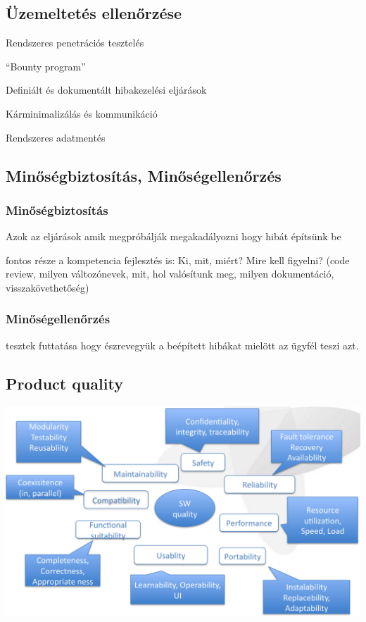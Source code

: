 \documentclass[a4paper,14pt, twocolumn]{extarticle}
\begin{document}
		\subsection{Üzemeltetés ellenőrzése}
			\begin{compactitem}
				\item Rendszeres penetrációs tesztelés 
				\item “Bounty program” 
				\item Definiált és dokumentált hibakezelési eljárások 
				\item Kárminimalizálás és kommunikáció 
				\item Rendszeres adatmentés
			\end{compactitem}
		\subsection{Minőségbiztosítás, Minőségellenőrzés}
			\subsubsection{Minőségbiztosítás}
				Azok az eljárások amik megpróbálják megakadályozni hogy hibát építsünk be 
				\begin{compactitem}
					\item fontos része a kompetencia fejlesztés is: Ki, mit, miért? Mire kell figyelni? (code review, milyen változónevek, mit, hol valósítunk meg, milyen dokumentáció, visszakövethetőség) 
				\end{compactitem}
			\subsubsection{Minőségellenőrzés}
				tesztek futtatása hogy észrevegyük a beépített hibákat mielött az ügyfél teszi azt.

		\onecolumn
			\subsection{Product quality}
			\begin{center}
				\includegraphics[width=18cm]{pq}
			\end{center}
		\twocolumn
		
\end{document}
